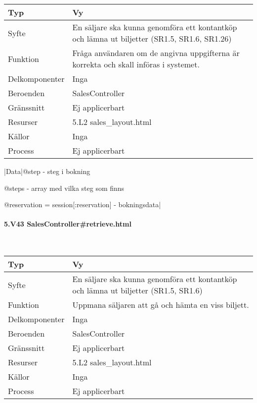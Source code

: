 \documentclass[a4paper, twoside, 11pt, titlepage]{article}
\begin{document}
			\begin {table} [ht] \begin{tabular} {  p{3.5cm} p{9.6cm} }
				\hline
				Typ & Vy  \\
				\hline
				Syfte & En säljare ska kunna genomföra ett kontantköp och lämna ut biljetter (SR1.5, SR1.6, SR1.26)  \\
				\hline
				Funktion & Fråga användaren om de angivna uppgifterna är korrekta och skall införas i systemet.  \\
				\hline
				Delkomponenter & Inga  \\
				\hline
				Beroenden & SalesController  \\
				\hline
				Gränssnitt & Ej applicerbart  \\
				\hline
				Resurser & 5.L2 sales\_layout.html  \\
				\hline
				Källor & Inga  \\
				\hline
				Process & Ej applicerbart  \\
				\hline
			\end{tabular} \end{table} \FloatBarrier
			\vspace{6mm}

			|Data|@step - steg i bokning

			@steps - array med vilka steg som finns

			@reservation = session[:reservation] - bokningsdata|

			\paragraph{5.V43 SalesController\#retrieve.html}\

			\begin {table} [ht] \begin{tabular} {  p{3.5cm} p{9.6cm} }
				\hline
				Typ & Vy  \\
				\hline
				Syfte & En säljare ska kunna genomföra ett kontantköp och lämna ut biljetter (SR1.5, SR1.6)  \\
				\hline
				Funktion & Uppmana säljaren att gå och hämta en viss biljett.  \\
				\hline
				Delkomponenter & Inga  \\
				\hline
				Beroenden & SalesController  \\
				\hline
				Gränssnitt & Ej applicerbart  \\
				\hline
				Resurser & 5.L2 sales\_layout.html  \\
				\hline
				Källor & Inga  \\
				\hline
				Process & Ej applicerbart  \\
				\hline
			\end{tabular} \end{table} \FloatBarrier
			\vspace{6mm}
\end{document}
